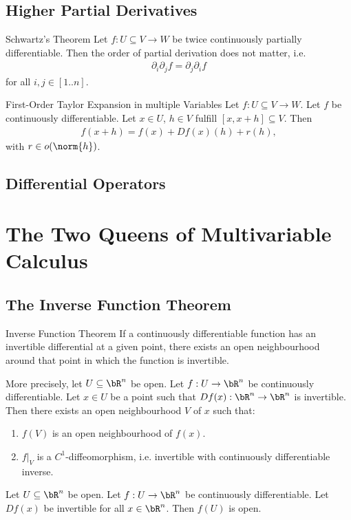 \section{Higher Partial Derivatives}
\begin{importanttheorem}{Schwartz's Theorem}{}
	Let $f : U \subseteq V \to W$ be twice continuously partially differentiable. Then the order of partial derivation does not matter, i.e.
	\begin{align*}
		\partial_i \partial_j f = \partial_j \partial_i f
	\end{align*}
	for all $i,j \in [1..n]$.
\end{importanttheorem}
\begin{importanttheorem}{First-Order Taylor Expansion in multiple Variables}{}
	Let $f : U \subseteq V \to W$. Let $f$ be continuously differentiable. Let $x \in U$, $h \in V$ fulfill $[x,x+h] \subseteq V$. Then
	\begin{align*}
		f(x+h) = f(x) + Df(x)(h) + r(h),
	\end{align*}
	with $r \in o(\norm{h})$.
\end{importanttheorem}

\clearpage

\section{Differential Operators}
\chapter{The Two Queens of Multivariable Calculus}
\section{The Inverse Function Theorem}
\begin{importanttheorem}{Inverse Function Theorem}{}
	If a continuously differentiable function has an invertible differential at a given point, there exists an open neighbourhood around that point in which the function is invertible.
	
	More precisely, let $U \subseteq \bR^n$ be open. Let $f : U \to \bR^n$ be continuously differentiable. Let $x \in U$ be a point such that $Df(x) : \bR^n \to \bR^n$ is invertible. Then there exists an open neighbourhood $V$ of $x$ such that:
	\begin{enumerate}
		\item $f(V)$ is an open neighbourhood of $f(x)$.
		\item $f|_V$ is a $C^1$-diffeomorphism, i.e. invertible with continuously differentiable inverse.
	\end{enumerate}
\end{importanttheorem}
\begin{corollary}
	Let $U \subseteq \bR^n$ be open. Let $f : U \to \bR^n$ be continuously differentiable. Let $Df(x)$ be invertible for all $x \in \bR^n$. Then $f(U)$ is open.
\end{corollary}
